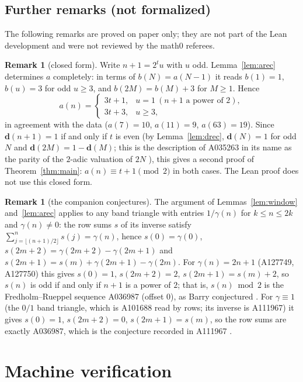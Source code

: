 \documentclass[11pt]{amsart}
\theoremstyle{plain}
\theoremstyle{definition}
\newtheorem{remark}[theorem]{Remark}
\newcommand{\pd}{\mathbf{d}}
\begin{document}
\subsection{Further remarks (not formalized)}
The following remarks are proved on paper only; they are not part of the Lean development and were not reviewed by the math0 referees.

\begin{remark}[closed form]\label{rem:closed}
Write $n+1=2^t u$ with $u$ odd. Lemma~\ref{lem:arec} determines $a$ completely: in terms of $b(N)=a(N-1)$ it reads $b(1)=1$, $b(u)=3$ for odd $u\ge3$, and $b(2M)=b(M)+3$ for $M\ge1$. Hence
\[
  a(n)=\begin{cases}3t+1,& u=1 \ (\text{$n+1$ a power of $2$}),\\ 3t+3,& u\ge3,\end{cases}
\]
in agreement with the data ($a(7)=10$, $a(11)=9$, $a(63)=19$). Since $\pd(n+1)=1$ if and only if $t$ is even (by Lemma~\ref{lem:drec}, $\pd(N)=1$ for odd $N$ and $\pd(2M)=1-\pd(M)$; this is the description of A035263 in its name as the parity of the $2$-adic valuation of $2N$ \cite{A035263}), this gives a second proof of Theorem~\ref{thm:main}: $a(n)\equiv t+1\pmod 2$ in both cases. The Lean proof does not use this closed form.
\end{remark}

\begin{remark}[the companion conjectures]\label{rem:companion}
The argument of Lemmas~\ref{lem:window} and~\ref{lem:arec} applies to any band triangle with entries $1/\gamma(n)$ for $k\le n\le 2k$ and $\gamma(n)\ne0$: the row sums $s$ of its inverse satisfy $\sum_{j=\lfloor(n+1)/2\rfloor}^n s(j)=\gamma(n)$, hence $s(0)=\gamma(0)$, $s(2m+2)=\gamma(2m+2)-\gamma(2m+1)$ and $s(2m+1)=s(m)+\gamma(2m+1)-\gamma(2m)$. For $\gamma(n)=2n+1$ (A127749, A127750) this gives $s(0)=1$, $s(2m+2)=2$, $s(2m+1)=s(m)+2$, so $s(n)$ is odd if and only if $n+1$ is a power of $2$; that is, $s(n)\bmod 2$ is the Fredholm--Rueppel sequence A036987 (offset $0$), as Barry conjectured \cite{A127749,A127750}. For $\gamma\equiv1$ (the $0/1$ band triangle, which is A101688 read by rows; its inverse is A111967) it gives $s(0)=1$, $s(2m+2)=0$, $s(2m+1)=s(m)$, so the row sums are exactly A036987, which is the conjecture recorded in A111967 \cite{A111967}.
\end{remark}

\section{Machine verification}\label{sec:lean}
\end{document}
